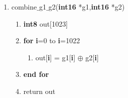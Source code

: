\documentclass[journal,10pt,onecolumn]{article}
\begin{document}
\begin{enumerate}
\begin{enumerate}
    \item combine$\_$g1$\_$g2(\textbf{int16} *g1,\textbf{int16} *g2)
    \begin{enumerate}
        \item[] \textbf{int8} out[1023]
        \item[] \textbf{for} \textbf{i}=0 to \textbf{i}=1022
        \begin{enumerate}
            \item[] out[\textbf{i}] = g1[\textbf{i}] $\oplus$ g2[\textbf{i}]
        \end{enumerate}
        \item[]  \textbf{end for}
        \item[]  return out
    \end{enumerate}
    


\end{enumerate}
\end{enumerate}
\end{document}
